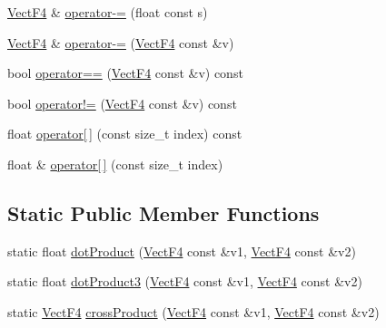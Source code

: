 \begin{DoxyCompactItemize}
\item 
\hyperlink{classVectF4}{Vect\-F4} \& \hyperlink{classVectF4_aa61828d33d4d4f528dbf9e160beb7fce}{operator-\/=} (float const s)
\item 
\hyperlink{classVectF4}{Vect\-F4} \& \hyperlink{classVectF4_aff9d363a33895066041a2222be85f224}{operator-\/=} (\hyperlink{classVectF4}{Vect\-F4} const \&v)
\item 
bool \hyperlink{classVectF4_af140887d9c28f3be48edb6e47ad60029}{operator==} (\hyperlink{classVectF4}{Vect\-F4} const \&v) const 
\item 
bool \hyperlink{classVectF4_aa2a58d6a97ad5d4370d66df94eea40dc}{operator!=} (\hyperlink{classVectF4}{Vect\-F4} const \&v) const 
\item 
float \hyperlink{classVectF4_acc0d3e6dab887339b6305759ac6dddf7}{operator\mbox{[}$\,$\mbox{]}} (const size\-\_\-t index) const 
\item 
float \& \hyperlink{classVectF4_a83ff10bb5b70856676c39ce278d00dcb}{operator\mbox{[}$\,$\mbox{]}} (const size\-\_\-t index)
\end{DoxyCompactItemize}
\subsection*{Static Public Member Functions}
\begin{DoxyCompactItemize}
\item 
static float \hyperlink{classVectF4_aa7257aeea04266112fd99d8af04b61de}{dot\-Product} (\hyperlink{classVectF4}{Vect\-F4} const \&v1, \hyperlink{classVectF4}{Vect\-F4} const \&v2)
\item 
static float \hyperlink{classVectF4_ab7b2245342bae8496ebf0c9df979817a}{dot\-Product3} (\hyperlink{classVectF4}{Vect\-F4} const \&v1, \hyperlink{classVectF4}{Vect\-F4} const \&v2)
\item 
static \hyperlink{classVectF4}{Vect\-F4} \hyperlink{classVectF4_a8c8a68d4b3b15fe920eca59dc7f6a254}{cross\-Product} (\hyperlink{classVectF4}{Vect\-F4} const \&v1, \hyperlink{classVectF4}{Vect\-F4} const \&v2)
\end{DoxyCompactItemize}
